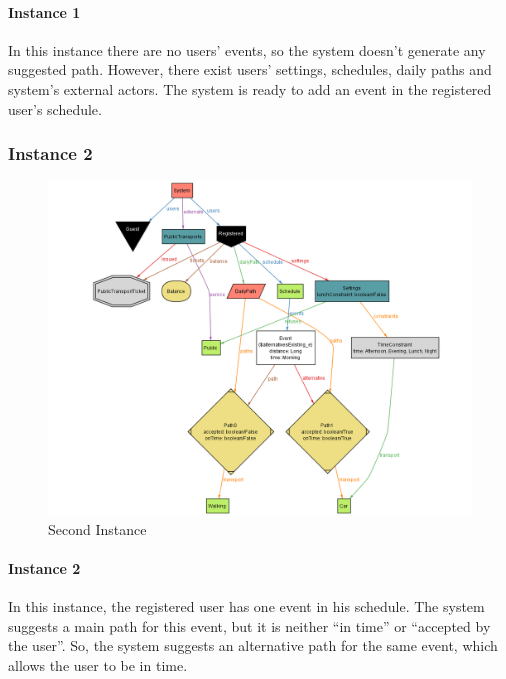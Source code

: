 \documentclass{article}
\begin{document}
\paragraph{Instance 1\\}
In this instance there are no users’ events, so the system doesn’t generate any suggested path. However, there exist users’ settings, schedules, daily paths and system’s external actors. The system is ready to add an event in the registered user’s schedule. 
\subsubsection{Instance 2}
\begin{figure}[H]
\includegraphics[width=\linewidth]{Instance_2.png}
\caption{Second Instance}
\label{fig:ALLOY2}
\end{figure}
\paragraph{Instance 2\\}
In this instance, the registered user has one event in his schedule. The system suggests a main path for this event, but it is neither “in time” or “accepted by the user”. So, the system suggests an alternative path for the same event, which allows the user to be in time.
\end{document}
